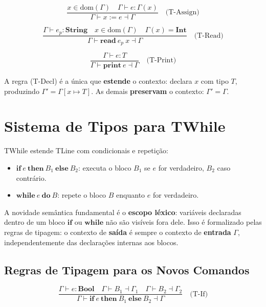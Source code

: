 \[
  \frac{x \in \mathrm{dom}(\Gamma) \quad \Gamma \vdash e : \Gamma(x)}
  {\Gamma \vdash x \mathbin{:=} e \dashv \Gamma} \quad\text{(T-Assign)}
\]

\[
  \frac{\Gamma \vdash e_p : \mathbf{String} \quad x \in
  \mathrm{dom}(\Gamma) \quad \Gamma(x) = \mathbf{Int}}
  {\Gamma \vdash \mathbf{read}\ e_p\ x \dashv \Gamma} \quad\text{(T-Read)}
\]

\[
  \frac{\Gamma \vdash e : T}
  {\Gamma \vdash \mathbf{print}\ e \dashv \Gamma} \quad\text{(T-Print)}
\]

A regra (T-Decl) é a única que \textbf{estende} o contexto: declara
\(x\) com tipo \(T\), produzindo \(\Gamma' = \Gamma[x \mapsto T]\).
As demais \textbf{preservam} o contexto: \(\Gamma' = \Gamma\).

\section{Sistema de Tipos para TWhile}

TWhile estende TLine com condicionais e repetição:

\begin{itemize}
  \item \(\mathbf{if}\ e\ \mathbf{then}\ B_1\ \mathbf{else}\ B_2\):
    executa o bloco \(B_1\) se \(e\) for verdadeiro, \(B_2\) caso contrário.
  \item \(\mathbf{while}\ e\ \mathbf{do}\ B\): repete o bloco \(B\)
    enquanto \(e\) for verdadeiro.
\end{itemize}

A novidade semântica fundamental é o \textbf{escopo léxico}: variáveis
declaradas dentro de um bloco \(\mathbf{if}\) ou \(\mathbf{while}\)
não são visíveis fora dele. Isso é formalizado pelas regras de tipagem:
o contexto de \textbf{saída} é sempre o contexto de
\textbf{entrada} \(\Gamma\), independentemente das declarações
internas aos blocos.

\subsection{Regras de Tipagem para os Novos Comandos}

\[
  \frac{\Gamma \vdash e : \mathbf{Bool}
    \quad \Gamma \vdash B_1 \dashv \Gamma_1
  \quad \Gamma \vdash B_2 \dashv \Gamma_2}
  {\Gamma \vdash
  \mathbf{if}\ e\ \mathbf{then}\ B_1\ \mathbf{else}\ B_2 \dashv \Gamma}
  \quad\text{(T-If)}
\]

